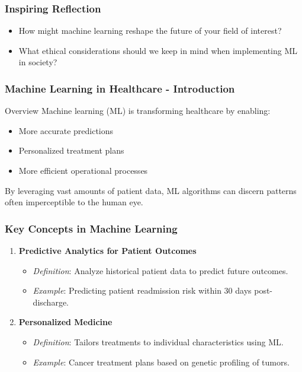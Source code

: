 \documentclass[aspectratio=169]{beamer}
\begin{document}
\begin{frame}[fragile]
    \frametitle{Inspiring Reflection}
    \begin{itemize}
        \item How might machine learning reshape the future of your field of interest?
        \item What ethical considerations should we keep in mind when implementing ML in society?
    \end{itemize}
\end{frame}

\begin{frame}[fragile]
    \frametitle{Machine Learning in Healthcare - Introduction}
    \begin{block}{Overview}
        Machine learning (ML) is transforming healthcare by enabling:
        \begin{itemize}
            \item More accurate predictions
            \item Personalized treatment plans
            \item More efficient operational processes
        \end{itemize}
        By leveraging vast amounts of patient data, ML algorithms can discern patterns often imperceptible to the human eye.
    \end{block}
\end{frame}

\begin{frame}[fragile]
    \frametitle{Key Concepts in Machine Learning}
    \begin{enumerate}
        \item \textbf{Predictive Analytics for Patient Outcomes}
            \begin{itemize}
                \item \textit{Definition}: Analyze historical patient data to predict future outcomes.
                \item \textit{Example}: Predicting patient readmission risk within 30 days post-discharge.
            \end{itemize}
        
        \item \textbf{Personalized Medicine}
            \begin{itemize}
                \item \textit{Definition}: Tailors treatments to individual characteristics using ML.
                \item \textit{Example}: Cancer treatment plans based on genetic profiling of tumors.
            \end{itemize}
    \end{enumerate}
\end{frame}
\end{document}
